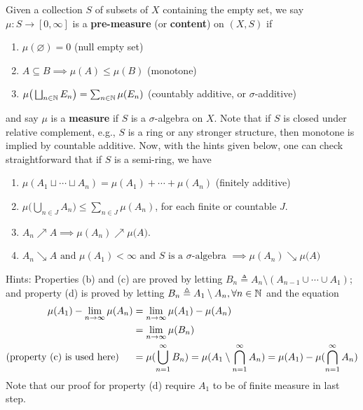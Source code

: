 \documentclass{report}
\begin{document}
\begin{mdframed}
Given a collection $S$ of subsets of  $X$ containing the empty set, we say  $\mu:S\rightarrow [0,\infty]$ is a \textbf{pre-measure} (or \textbf{content}) on $(X,S)$ if 
\begin{enumerate}[label=(\alph*)] 
  \item $\mu(\varnothing)=0$ (null empty set) 
  \item $A \subseteq B \implies \mu (A) \leq \mu (B)$ (monotone)
  \item $\mu\big(\bigsqcup_{n\in\mathbb{N}} E_n \big)=\sum_{n\in\mathbb{N}} \mu (E_n)$ (countably additive, or $\sigma$-additive)
\end{enumerate}
and say $\mu$ is a \textbf{measure} if $S$ is a $\sigma$-algebra on $X$. Note that if $S$ is closed under relative complement, e.g., $S$ is a ring or any stronger structure, then monotone is implied by countable additive. Now, with the hints given below, one can check straightforward that if $S$ is a semi-ring, we have 
\begin{enumerate}[label=(\alph*)]
\label{pop_meas}
  \item $\mu (A_1 \sqcup   \cdots \sqcup   A_n)= \mu (A_1) + \cdots + \mu (A_n)$ (finitely additive)
  \item $\mu \big(\bigcup_{n \in J} A_n\big)\leq \sum_{n\in J} \mu (A_n)$, for each finite or countable $J$.   \item $A_n \nearrow A \implies \mu (A_n)\nearrow \mu \big(A\big)$.  
  \item $A_n\searrow A\text{ and }\mu (A_1)<\infty \text{ and }S\text{ is a $\sigma$-algebra }\implies \mu (A_n)\searrow \mu \big(A\big)$  
\end{enumerate}
Hints: Properties (b) and (c) are proved by letting $B_n\triangleq A_n \setminus (A_{n-1}\cup \cdots \cup  A_1)$; and property (d) is proved by letting $B_n\triangleq A_1 \setminus A_n,\forall n\in\mathbb{N}$ and the equation 
\begin{align*}
\mu (A_1)-\lim_{n\to \infty} \mu (A_n)&=\lim_{n\to \infty}\mu (A_1)-\mu (A_n)\\
&=\lim_{n\to \infty} \mu (B_n)\\
(\text{property (c) is used here})\hspace{0.5cm}&=\mu (\bigcup_{n=1}^{\infty}B_n)=\mu (A_1 \setminus \bigcap_{n=1}^{\infty}A_n)=\mu (A_1)- \mu (\bigcap_{n=1}^{\infty}A_n)
\end{align*}
Note that our proof for property (d) require $A_1$ to be of finite measure in last step. 
\end{mdframed}
\end{document}
